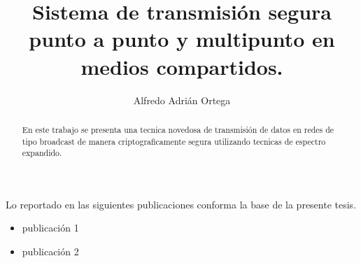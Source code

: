 \documentclass[12pt,twoside,openright]{moddalthesis}
\begin{document}
\title{\textbf{Sistema de transmisión segura punto a punto y multipunto en medios compartidos.}}
\author{Alfredo Adrián Ortega}
\address{Buenos Aires, Argentina}


{}








\nodedicationpage
\nolistoftables
\nolistoffigures


\beforepreface
 
\begin{abstract}
En este trabajo se presenta una tecnica novedosa de transmisión de datos en redes de tipo broadcast de manera criptograficamente segura utilizando tecnicas de espectro expandido.
\end{abstract}




\begin{listofpubs}
Lo reportado en las siguientes publicaciones conforma la base de la
presente tesis.

\begin{itemize}
\item publicación 1
\item publicación 2
\end{itemize}
\end{listofpubs}
\end{document}

